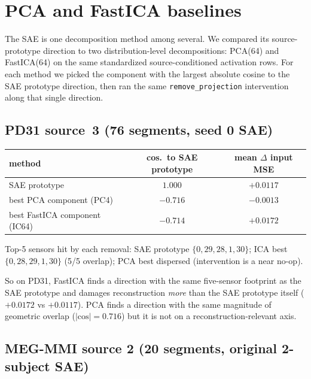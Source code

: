 \documentclass[11pt]{article}
\newcommand{\dmse}{$\Delta$ input MSE}
\begin{document}
\section{PCA and FastICA baselines}\label{sec:baseline}

The SAE is one decomposition method among several. We compared its
source-prototype direction to two distribution-level decompositions:
{PCA}(64) and {FastICA}(64)
\cite{bell1995infomax,hyvarinen2000,makeig1996} on the same standardized
source-conditioned activation rows.
For each method we picked the component with the largest absolute cosine to the
SAE prototype direction, then ran the same \texttt{remove\_projection}
intervention along that single direction.

\subsection{PD31 source~3 (76 segments, seed 0 SAE)}

\begin{table}[h]
\centering
\small
\begin{tabular}{lcc}
\toprule
\textbf{method} & \textbf{cos.\ to SAE prototype} & \textbf{mean \dmse{}} \\
\midrule
SAE prototype                  & $1.000$  & $+0.0117$ \\
best PCA component (PC4)       & $-0.716$ & $-0.0013$ \\
best FastICA component (IC64)  & $-0.714$ & $\mathbf{+0.0172}$ \\
\bottomrule
\end{tabular}
\end{table}

Top-5 sensors hit by each removal: SAE prototype $\{0, 29, 28, 1, 30\}$;
ICA best $\{0, 28, 29, 1, 30\}$ (5/5 overlap); PCA best dispersed
(intervention is a near no-op).

So on PD31, FastICA finds a direction with the same five-sensor footprint as
the SAE prototype and damages reconstruction \emph{more} than the SAE
prototype itself ($+0.0172$ vs $+0.0117$). PCA finds a direction with the same
magnitude of geometric overlap ($|\mathrm{cos}| = 0.716$) but it is not on a
reconstruction-relevant axis.

\subsection{MEG-MMI source 2 (20 segments, original 2-subject SAE)}
\end{document}
